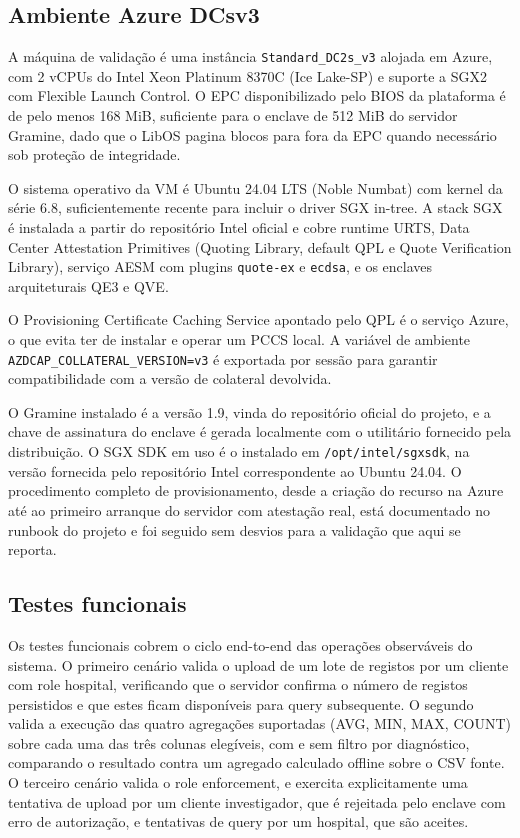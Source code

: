\subsection{Ambiente Azure DCsv3}

A máquina de validação é uma instância \texttt{Standard\_DC2s\_v3} alojada em Azure, com 2 vCPUs do Intel Xeon Platinum 8370C (Ice Lake-SP) e suporte a SGX2 com Flexible Launch Control. O EPC disponibilizado pelo BIOS da plataforma é de pelo menos 168 MiB, suficiente para o enclave de 512 MiB do servidor Gramine, dado que o LibOS pagina blocos para fora da EPC quando necessário sob proteção de integridade.

O sistema operativo da VM é Ubuntu 24.04 LTS (Noble Numbat) com kernel da série 6.8, suficientemente recente para incluir o driver SGX in-tree. A stack SGX é instalada a partir do repositório Intel oficial e cobre runtime URTS, Data Center Attestation Primitives (Quoting Library, default QPL e Quote Verification Library), serviço AESM com plugins \texttt{quote-ex} e \texttt{ecdsa}, e os enclaves arquiteturais QE3 e QVE.

O Provisioning Certificate Caching Service apontado pelo QPL é o serviço Azure, o que evita ter de instalar e operar um PCCS local. A variável de ambiente \texttt{AZDCAP\_COLLATERAL\_}\texttt{VERSION=v3} é exportada por sessão para garantir compatibilidade com a versão de colateral devolvida.

O Gramine instalado é a versão 1.9, vinda do repositório oficial do projeto, e a chave de assinatura do enclave é gerada localmente com o utilitário fornecido pela distribuição. O SGX SDK em uso é o instalado em \texttt{/opt/intel/sgxsdk}, na versão fornecida pelo repositório Intel correspondente ao Ubuntu 24.04. O procedimento completo de provisionamento, desde a criação do recurso na Azure até ao primeiro arranque do servidor com atestação real, está documentado no runbook do projeto e foi seguido sem desvios para a validação que aqui se reporta.

\subsection{Testes funcionais}

Os testes funcionais cobrem o ciclo end-to-end das operações observáveis do sistema. O primeiro cenário valida o upload de um lote de registos por um cliente com role hospital, verificando que o servidor confirma o número de registos persistidos e que estes ficam disponíveis para query subsequente. O segundo valida a execução das quatro agregações suportadas (AVG, MIN, MAX, COUNT) sobre cada uma das três colunas elegíveis, com e sem filtro por diagnóstico, comparando o resultado contra um agregado calculado offline sobre o CSV fonte. O terceiro cenário valida o role enforcement, e exercita explicitamente uma tentativa de upload por um cliente investigador, que é rejeitada pelo enclave com erro de autorização, e tentativas de query por um hospital, que são aceites.

